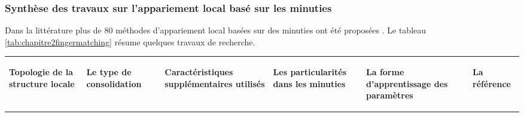 \subsubsection{Synthèse des travaux sur l’appariement local basé sur les minuties}
Dans la littérature plus de 80 méthodes d'appariement local basées sur des minuties ont été proposées \citep{Peralta2015a}.
 Le tableau \ref{tab:chapitre2fingermatching} résume quelques travaux de recherche.
 
 	\begin{sidewaystable}[h!]
 		\centering
 		 \caption{Quelques travaux de recherche sur l'appariement local basé sur les minuties.}%
  		\label{tab:chapitre2fingermatching}
 		\begin{tabular}{|p{4cm}|p{4cm}|p{4cm}|p{3cm}|p{3cm}|p{4cm}|}
 			\hline
 		\begin{center}
 				\textbf{Topologie de la structure locale}
 		\end{center} &\begin{center}
 		 \textbf{Le type de consolidation}
 	\end{center} &\begin{center}
 	 \textbf{Caractéristiques supplémentaires utilisés}
 \end{center} & \begin{center}
 \textbf{Les particularités dans les minuties} 
\end{center}& \begin{center}
\textbf{La forme d’apprentissage des paramètres}
\end{center} &\begin{center}
 \textbf{La référence}\begin{center}
 	

\end{center}
\end{center}
\end{tabular}
\end{sidewaystable}
